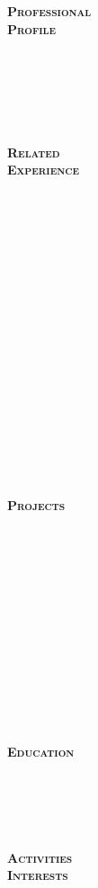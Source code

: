\documentclass[10pt]{article}
\begin{document}
\begin{minipage}[t]{0.16\linewidth} 
	\textbf{\textsc{
	\hspace{-5pt}Professional\\Profile \\ \\ \\ \\ \\ \\ \\
	Related\\Experience \\ \\ \\ \\ \\ \\ \\ \\ \\ \\ \\ \\ \\ \\ \\ \\ \\ \\ \\
	Projects \\ \\ \\ \\ \\ \\ \\ \\ \\ \\  \\ \\ \\ \\ 
	Education \\ \\ \\ \\ \\ \\
	Activities\\Interests
	}}
\end{minipage}
\end{document}
